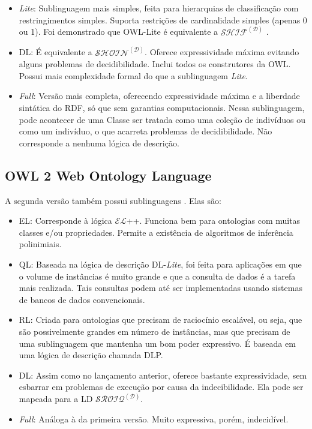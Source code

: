 \begin{itemize}
	\item \textit{Lite}: Sublinguagem mais simples, feita para hierarquias de classificação com restringimentos simples. Suporta restrições de cardinalidade simples (apenas 0 ou 1).  Foi demonstrado que OWL-Lite é equivalente a $ \mathcal{SHIF^{(D)}} $ \citep{ferramentasGrau}.
	\item DL: É equivalente a $ \mathcal{SHOIN^{(D)}} $. Oferece expressividade máxima evitando alguns problemas de decidibilidade. Inclui todos os construtores da OWL. Possui mais complexidade formal do que a sublinguagem \textit{Lite}.
	\item \textit{Full}: Versão mais completa, oferecendo expressividade máxima e a liberdade sintática do RDF, só que sem garantias computacionais. Nessa sublinguagem, pode acontecer de uma Classe ser tratada como uma coleção de indivíduos ou como um indivíduo, o que acarreta problemas de decidibilidade. Não corresponde a nenhuma lógica de descrição.
\end{itemize}

\subsection{OWL 2 Web Ontology Language}

A segunda versão também possui sublinguagens \citep{ferramentasOWL2}. Elas são:

\begin{itemize}
	\item EL: Corresponde à lógica $ \mathcal{EL} $++. Funciona bem para ontologias com muitas classes e/ou propriedades. Permite a existência de algoritmos de inferência polinimiais.
	\item QL: Baseada na lógica de descrição DL-\textit{Lite}, foi feita para aplicações em que o volume de instâncias é muito grande e que a consulta de dados é a tarefa mais realizada. Tais consultas podem até ser implementadas usando sistemas de bancos de dados convencionais.
	\item RL: Criada para ontologias que precisam de raciocínio escalável, ou seja, que são possivelmente grandes em número de instâncias, mas que precisam de uma sublinguagem que mantenha um bom poder expressivo. É baseada em uma lógica de descrição chamada DLP.
	\item DL: Assim como no lançamento anterior, oferece bastante expressividade, sem esbarrar em problemas de execução por causa da indecibilidade. Ela pode ser mapeada para a LD $ \mathcal{SROIQ^{(D)}} $. 
	\item \textit{Full}: Análoga à da primeira versão. Muito expressiva, porém, indecidível.
\end{itemize}

